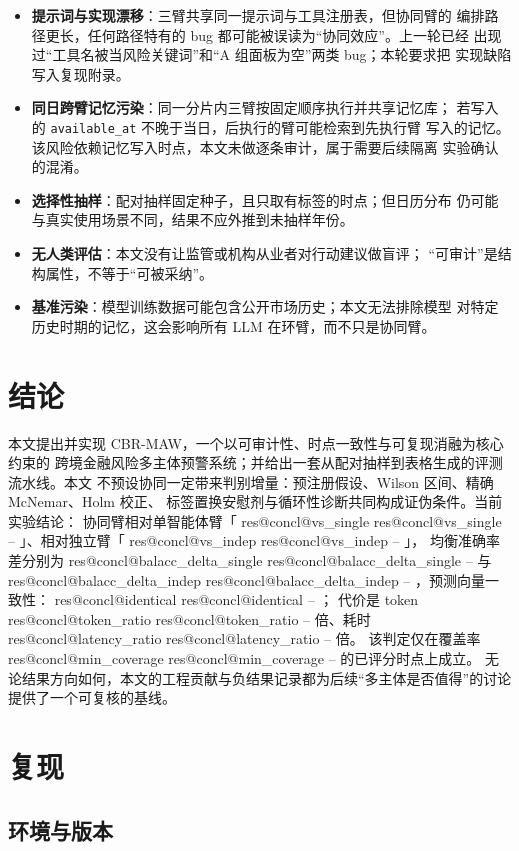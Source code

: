 \documentclass[UTF8,fontset=fandol,11pt,a4paper]{ctexart}
\makeatletter
\newcommand{\RESULT}[2]{%
  \ifcsname res@#1@#2\endcsname
    \csname res@#1@#2\endcsname
  \else
    --%
  \fi}
\makeatother
\begin{document}
\begin{itemize}
  \item \textbf{提示词与实现漂移}：三臂共享同一提示词与工具注册表，但协同臂的
        编排路径更长，任何路径特有的 bug 都可能被误读为“协同效应”。上一轮已经
        出现过“工具名被当风险关键词”和“A 组面板为空”两类 bug；本轮要求把
        实现缺陷写入复现附录。
  \item \textbf{同日跨臂记忆污染}：同一分片内三臂按固定顺序执行并共享记忆库；
        若写入的 \texttt{available\_at} 不晚于当日，后执行的臂可能检索到先执行臂
        写入的记忆。该风险依赖记忆写入时点，本文未做逐条审计，属于需要后续隔离
        实验确认的混淆。
  \item \textbf{选择性抽样}：配对抽样固定种子，且只取有标签的时点；但日历分布
        仍可能与真实使用场景不同，结果不应外推到未抽样年份。
  \item \textbf{无人类评估}：本文没有让监管或机构从业者对行动建议做盲评；
        “可审计”是结构属性，不等于“可被采纳”。
  \item \textbf{基准污染}：模型训练数据可能包含公开市场历史；本文无法排除模型
        对特定历史时期的记忆，这会影响所有 LLM 在环臂，而不只是协同臂。
\end{itemize}

\section{结论}

本文提出并实现 CBR-MAW，一个以可审计性、时点一致性与可复现消融为核心约束的
跨境金融风险多主体预警系统；并给出一套从配对抽样到表格生成的评测流水线。本文
不预设协同一定带来判别增量：预注册假设、Wilson 区间、精确 McNemar、Holm 校正、
标签置换安慰剂与循环性诊断共同构成证伪条件。当前实验结论：
协同臂相对单智能体臂「\RESULT{concl}{vs_single}」、相对独立臂「\RESULT{concl}{vs_indep}」，
均衡准确率差分别为 \RESULT{concl}{balacc_delta_single} 与
\RESULT{concl}{balacc_delta_indep}，预测向量一致性：\RESULT{concl}{identical}；
代价是 token \RESULT{concl}{token_ratio} 倍、耗时 \RESULT{concl}{latency_ratio} 倍。
该判定仅在覆盖率 \RESULT{concl}{min_coverage} 的已评分时点上成立。
无论结果方向如何，本文的工程贡献与负结果记录都为后续“多主体是否值得”的讨论
提供了一个可复核的基线。

\appendix
\section{复现}
\label{app:repro}

\subsection{环境与版本}
\end{document}
